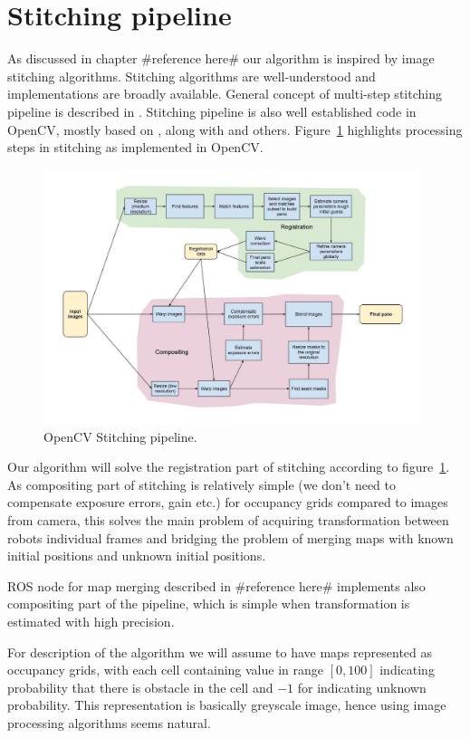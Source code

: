 \section{Stitching pipeline} %
\label{sec:stitching_pipeline}

As discussed in chapter \#reference here\# our algorithm is inspired by image stitching algorithms. Stitching algorithms are well-understood and implementations are broadly available. General concept of multi-step stitching pipeline is described in \cite{Brown2006}. Stitching pipeline is also well established code in OpenCV, mostly based on \cite{Brown2006}, along with \cite{Szeliski2004} \cite{Shum1998} and others. Figure~\ref{fig:opencv} highlights processing steps in stitching as implemented in OpenCV.

\begin{figure}
	\centering
	\includegraphics[width=4.33in]{../img/StitchingPipeline.jpg}
	\caption{OpenCV Stitching pipeline.}
	\label{fig:opencv}
\end{figure}

Our algorithm will solve the registration part of stitching according to figure~\ref{fig:opencv}. As compositing part of stitching is relatively simple (we don't need to compensate exposure errors, gain etc.) for occupancy grids compared to images from camera, this solves the main problem of acquiring transformation between robots individual frames and bridging the problem of merging maps with known initial positions and unknown initial positions.

ROS node for map merging described in \#reference here\# implements also compositing part of the pipeline, which is simple when transformation is estimated with high precision.

For description of the algorithm we will assume to have maps represented as occupancy grids, with each cell containing value in range $[0,100]$ indicating probability that there is obstacle in the cell and $-1$ for indicating unknown probability. This representation is basically greyscale image, hence using image processing algorithms seems natural.

